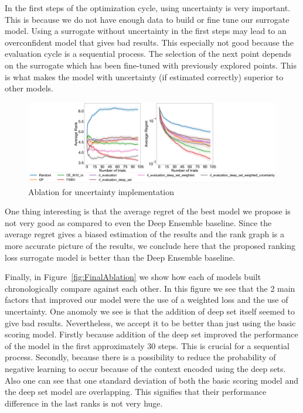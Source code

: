 \documentclass[12pt, twoside, ngerman]{report}
\begin{document}
In the first steps of the optimization cycle,  using uncertainty is very important.  This is because we do not have enough data to build or fine tune our surrogate model.
Using a surrogate without uncertainty in the first steps may lead to an overconfident model that gives bad results.
This especially not good because the evaluation cycle is a sequential process.
The selection of the next point depends on the surrogate which has been fine-tuned with previously explored points.
This is what makes the model with uncertainty (if estimated correctly) superior to other models.
 
\begin{figure}[h]
  \centering
    \includegraphics[scale=0.20]{images/RLUncertaintybenchmark}
    \caption{Ablation for uncertainty implementation}
    \label{fig:RLUncertaintybenchmark}
\end{figure}

One thing interesting is that the average regret of the best model we propose is not very good as compared to even the Deep Ensemble baseline.
Since the average regret gives a biased estimation of the results and the rank graph is a more accurate picture of the results,  we conclude here that the proposed ranking loss surrogate model is better than the Deep Ensemble baseline.

Finally, in Figure~\ref{fig:FinalAblation} we show how each of models built chronologically compare against each other.
In this figure we see that the 2 main factors that improved our model were the use of a weighted loss and the use of uncertainty.
One anomoly we see is that the addition of deep set itself seemed to give bad results.
Nevertheless, we accept it to be better than just using the basic scoring model.
Firstly because addition of the deep set improved the performance of the model in the first approximately 30 steps.
This is crucial for a sequential process.
Secondly,  because there is a possibility to reduce the probability of negative learning to occur because of the context encoded using  the deep sets.
Also one can see that one standard deviation of both the basic scoring model and the deep set model are overlapping. 
This signifies that their performance difference in the last ranks is not very huge.
\end{document}
